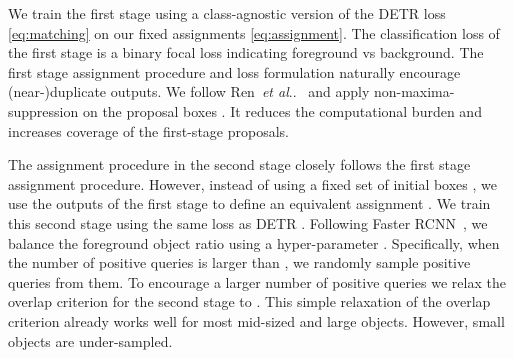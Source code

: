 \documentclass[10pt,twocolumn,letterpaper]{article}
\makeatletter
\newcommand{\myparagraph}[1]{\vspace{2pt}\noindent{\textbf{#1}}}
\newcommand{\refeqshort}[1]{\eqref{eq:#1}}
\DeclareRobustCommand\onedot{\futurelet\@let@token\@onedot}
\def\@onedot{\ifx\@let@token.\else.\null\fi\xspace}
\def\etal{\emph{et al}\onedot}
\makeatother
\begin{document}
We train the first stage using a class-agnostic version of the DETR loss  \refeqshort{matching} on our fixed assignments  \refeqshort{assignment}.
The classification loss  of the first stage is a binary focal loss indicating foreground vs background.
The first stage assignment procedure and loss formulation naturally encourage (near-)duplicate outputs.
We follow Ren~\etal~\cite{ren2015faster} and apply non-maxima-suppression on the proposal boxes .
It reduces the computational burden and increases coverage of the first-stage proposals.

\myparagraph{Second stage assignments.}
The assignment procedure in the second stage closely follows the first stage assignment procedure.
However, instead of using a fixed set of initial boxes , we use the outputs of the first stage  to define an equivalent assignment .
We train this second stage using the same loss as DETR .
Following Faster RCNN~\cite{ren2015faster}, we balance the foreground object ratio using a hyper-parameter .
Specifically, when the number of positive queries is larger than , we randomly sample  positive queries from them.
To encourage a larger number of positive queries we relax the overlap criterion for the second stage to .
This simple relaxation of the overlap criterion already works well for most mid-sized and large objects.
However, small objects are under-sampled.
\end{document}
